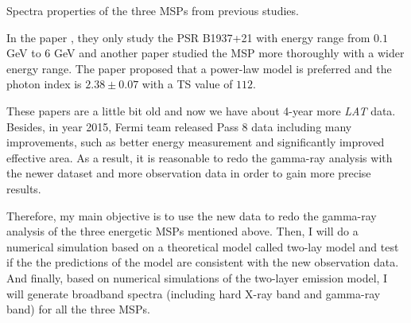 \documentclass[12pt]{report}
\newcommand{\mycaption}[1]{\protect \caption{#1}}
\begin{document}
        \begin{table}[!htp]
          \centering
          \vspace{0.5cm}
            \centering
            \mycaption{Spectra properties of the three MSPs from previous studies. 
              \cite{ATNF} \cite{0004-637X-787-2-167} \cite{J1939_old}}
            \label{table: previous_spectra_property}
        \end{table}
        In the paper \cite{J1939_old}, they only study the PSR B1937+21 with energy range from 
        $0.1$ GeV to $6$ GeV and another paper \cite{0004-637X-787-2-167} studied the MSP more 
        thoroughly with a wider energy range. The paper proposed that a power-law model is 
        preferred and the photon index is $2.38\pm0.07$ with a TS value of $112$. 
        
        These papers are a little bit old and now we have about 4-year more \textit{LAT} data. 
        Besides, in year 2015, Fermi team released Pass 8 data including many improvements, 
        such as better energy measurement and significantly improved effective area. 
        As a result, it is reasonable to redo the gamma-ray analysis with the newer dataset and 
        more observation data in order to gain more precise results. 

        Therefore, my main objective is to use the new data to redo the gamma-ray
        analysis of the three energetic MSPs mentioned above. Then, I will do a numerical
        simulation based on a theoretical model called two-lay model and test if the the 
        predictions of the model are consistent with the new observation data. And finally, based 
        on numerical simulations of the two-layer emission model, I will generate broadband 
        spectra (including hard X-ray band and gamma-ray band) for all the three MSPs. 
\end{document}
